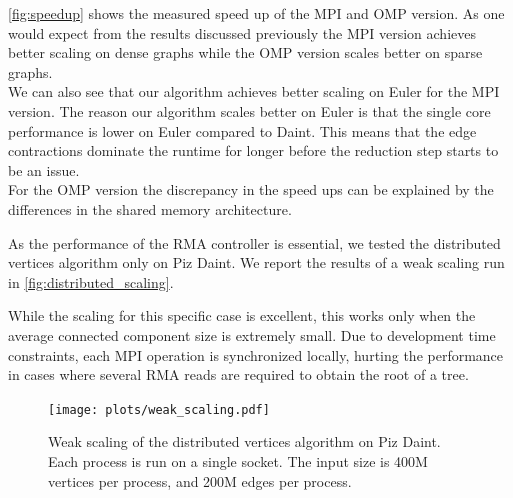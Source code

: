 \autoref{fig:speedup} shows the measured speed up of the MPI and OMP version. As one
would expect from the results discussed previously the MPI version achieves better scaling on dense
graphs while the OMP version scales better on sparse graphs.\\
We can also see that our algorithm achieves better scaling on Euler for the MPI version. The reason
our algorithm scales better on Euler is that the single core performance is lower on Euler compared
to Daint. This means that the edge contractions dominate the runtime for longer before the
reduction step starts to be an issue.\\
For the OMP version the discrepancy in the speed ups can be explained by the differences in the
shared memory architecture.

As the performance of the RMA controller is essential, we tested the distributed vertices algorithm only on Piz Daint.
We report the results of a weak scaling run in \autoref{fig:distributed_scaling}.

While the scaling for this specific case is excellent, this works only when the average connected component size is
extremely small. Due to development time constraints, each MPI operation is
synchronized locally, hurting the performance in cases where several RMA reads are required to obtain the
root of a tree.

\begin{figure}%
    \texttt{[image: plots/weak\_scaling.pdf]}
    \caption{Weak scaling of the distributed vertices algorithm on Piz Daint. Each process is run
    on a single socket. The input size is 400M vertices per process, and 200M edges per process.}
    \label{fig:distributed_scaling}
\end{figure}
